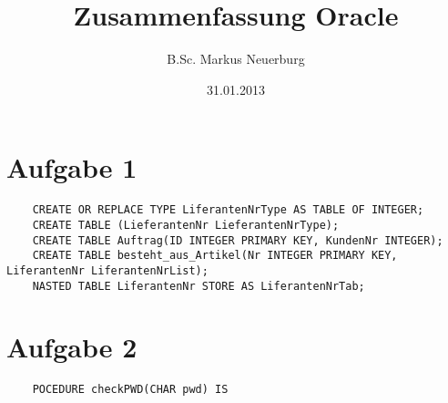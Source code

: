 \documentclass[12pt]{scrreprt}
\title{Zusammenfassung Oracle}
\author{B.Sc. Markus Neuerburg}
\date{31.01.2013}
\begin{document}
\setlength{\topmargin}{0cm}
\parindent 0pt
\chapter*{Aufgabe 1}
\begin{lstlisting}
	CREATE OR REPLACE TYPE LiferantenNrType AS TABLE OF INTEGER;
	CREATE TABLE (LieferantenNr LieferantenNrType);
	CREATE TABLE Auftrag(ID INTEGER PRIMARY KEY, KundenNr INTEGER);
	CREATE TABLE besteht_aus_Artikel(Nr INTEGER PRIMARY KEY, LiferantenNr LiferantenNrList);
	NASTED TABLE LiferantenNr STORE AS LiferantenNrTab;
\end{lstlisting}

\chapter*{Aufgabe 2}
\begin{lstlisting}
	POCEDURE checkPWD(CHAR pwd) IS
\end{lstlisting}
\end{document}
